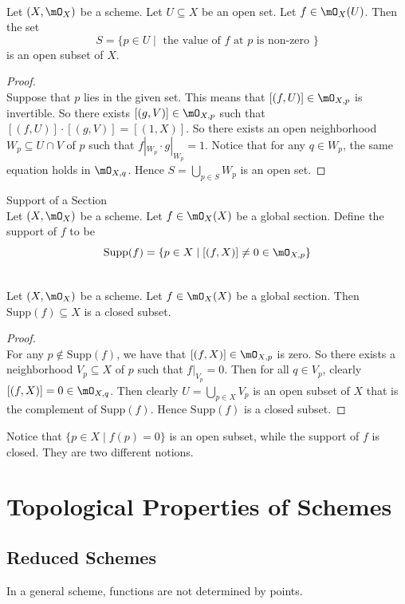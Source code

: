 \documentclass[a4paper]{article}
\begin{document}
\begin{lmm}{}{}\\
Let $(X,\mO_X)$ be a scheme. Let $U\subseteq X$ be an open set. Let $f\in\mO_X(U)$. Then the set $$S=\{p\in U\;|\;\text{ the value of }f\text{ at }p\text{ is non-zero }\}$$ is an open subset of $X$. 
\begin{proof}\\
Suppose that $p$ lies in the given set. This means that $[(f,U)]\in\mO_{X,p}$ is invertible. So there exists $[(g,V)]\in\mO_{X,p}$ such that $[(f,U)]\cdot[(g,V)]=[(1,X)]$. So there exists an open neighborhood $W_p\subseteq U\cap V$ of $p$ such that $f|_{W_p}\cdot g|_{W_p}=1$. Notice that for any $q\in W_p$, the same equation holds in $\mO_{X,q}$. Hence $S=\bigcup_{p\in S}W_p$ is an open set. 
\end{proof}
\end{lmm}

\begin{defn}{Support of a Section}{}\\
Let $(X,\mO_X)$ be a scheme. Let $f\in\mO_X(X)$ be a global section. Define the support of $f$ to be $$\text{Supp}(f)=\{p\in X\;|\;[(f,X)]\neq 0\in\mO_{X,p}\}$$
\end{defn}

\begin{lmm}{}{}\\
Let $(X,\mO_X)$ be a scheme. Let $f\in\mO_X(X)$ be a global section. Then $\text{Supp}(f)\subseteq X$ is a closed subset. 
\begin{proof}\\
For any $p\notin\text{Supp}(f)$, we have that $[(f,X)]\in\mO_{X,p}$ is zero. So there exists a neighborhood $V_p\subseteq X$ of $p$ such that $f|_{V_p}=0$. Then for all $q\in V_p$, clearly $[(f,X)]=0\in\mO_{X,q}$. Then clearly $U=\bigcup_{p\in X}V_p$ is an open subset of $X$ that is the complement of $\text{Supp}(f)$. Hence $\text{Supp}(f)$ is a closed subset. 
\end{proof}
\end{lmm}

Notice that $\{p\in X\;|\;f(p)=0\}$ is an open subset, while the support of $f$ is closed. They are two different notions. 

\pagebreak
\section{Topological Properties of Schemes}
\subsection{Reduced Schemes}
In a general scheme, functions are not determined by points. 
\end{document}
